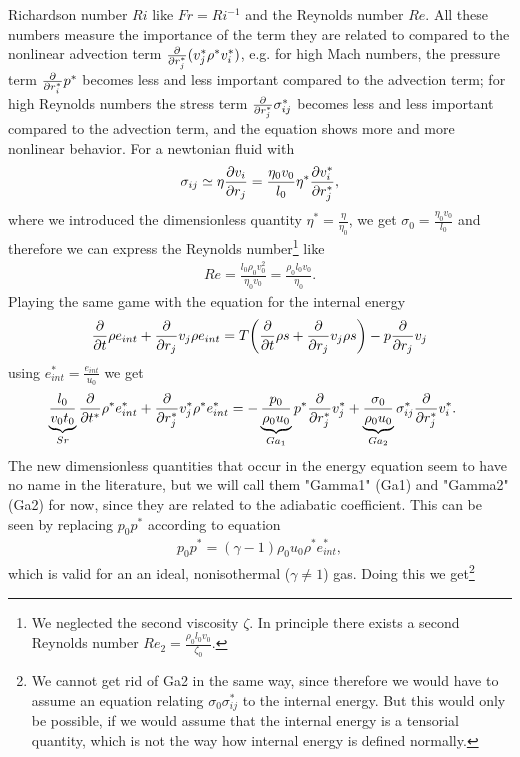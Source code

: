 Richardson number $Ri$ like $Fr=Ri^{-1}$ and the Reynolds number $Re$.
All these numbers measure the importance of the term they are related to
compared to the nonlinear advection term $\pd{r_j^*}(v_j^* \rho^* v_i^*)$,
e.g. for high Mach numbers, the pressure term $\pd{r_i^*}p^*$ becomes less and
less important compared to the advection term; for high Reynolds numbers the 
stress term $\pd{r_j^*}\sigma_{ij}^*$ becomes less and less important compared
to the advection term, and the equation shows more and more nonlinear behavior.
For a newtonian fluid with
\begin{align}
\sigma_{ij} \simeq \eta \ppd{r_j}{v_i} = 
\frac{\eta_0 v_0}{l_0} \eta^* \ppd{r_j^*}{v_i^*},
\end{align}
where we introduced the dimensionless quantity $\eta^*=\frac{\eta}{\eta_0}$,
we get $\sigma_0= \frac{\eta_0 v_0}{l_0}$ and therefore we can express the
Reynolds number\footnote{We neglected the second viscosity $\zeta$. In 
principle there exists a second Reynolds number $Re_2=\frac{\rho_0 l_0 v_0
}{\zeta_0}$.} like
\begin{align}
Re=\frac{l_0 \rho_0 v_0^2 }{\eta_0 v_0} = \frac{\rho_0 l_0 v_0 }{\eta_0}.
\end{align}
Playing the same game with the equation for the internal energy 
\begin{align}
\pd{t} \rho e_{int} + \pd{r_j} v_j \rho e_{int} = T \lra{\pd{t} \rho s +
\pd{r_j} v_j \rho s} -p \pd{r_j} v_j \label{eq:eint}
\end{align}
using $e_{int}^*=\frac{e_{int}}{u_0}$ we get
\begin{align*}
\underbrace{\frac{l_0}{v_0 t_0}}_{Sr} \pd{t^*}\rho^* e_{int}^* 
+ \pd{r_j^*} v_j^* \rho^* e_{int}^* &= 
-\underbrace{\frac{p_0}{\rho_0 u_0}}_{Ga_1} p^*\pd{r_j^*}v_j^*
+\underbrace{\frac{\sigma_0}{\rho_0 u_0}}_{Ga_2} \sigma_{ij}^* \pd{r_j^*}v_i^*.
\end{align*}
The new dimensionless quantities that occur in the energy equation seem to have
no name in the literature, but we will call them "Gamma1" (Ga1) and "Gamma2"
(Ga2) for now, since they are related to the adiabatic coefficient.
This can be seen by replacing $p_0 p^*$ according to equation
\begin{align}
p_0 p^* = (\gamma-1) \rho_0 u_0 \rho^* e_{int}^*,
\end{align}
which is valid for an an ideal, nonisothermal ($\gamma \neq 1$) gas. Doing this
we get\footnote{We cannot get rid of Ga2 in the same way, since therefore we
would have to assume an equation relating $\sigma_0 \sigma_{ij}^*$ to the
internal energy. But this would only be possible, if we would assume that the
internal energy is a tensorial quantity, which is not the way how
internal energy is defined normally.}
